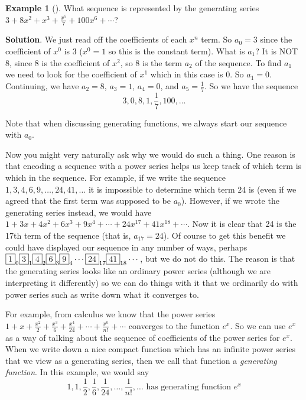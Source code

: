 \documentclass[10pt,]{book}
\theoremstyle{plain}
\theoremstyle{definition}
\theoremstyle{definition}
\newtheorem{example}[theorem]{Example}
\theoremstyle{definition}
\theoremstyle{definition}
\numberwithin{equation}{chapter}
\begin{document}
\begin{example}[]\label{example-22}
\hypertarget{p-955}{}%
What sequence is represented by the generating series \(3 + 8x^2 + x^3 + \frac{x^5}{7} + 100x^6 + \cdots\)?%
\par\smallskip%
\noindent\textbf{Solution}.\hypertarget{solution-94}{}\quad%
\hypertarget{p-956}{}%
We just read off the coefficients of each \(x^n\) term. So \(a_0 = 3\) since the coefficient of \(x^0\) is 3 (\(x^0 = 1\) so this is the constant term). What is \(a_1\)? It is NOT 8, since 8 is the coefficient of \(x^2\), so 8 is the term \(a_2\) of the sequence. To find \(a_1\) we need to look for the coefficient of \(x^1\) which in this case is 0. So \(a_1 = 0\). Continuing, we have \(a_2 = 8\), \(a_3 = 1\), \(a_4 = 0\), and \(a_5 = \frac{1}{7}\). So we have the sequence%
\begin{equation*}
3, 0, 8, 1, \frac{1}{7}, 100, \ldots
\end{equation*}
%
\par
\hypertarget{p-957}{}%
Note that when discussing generating functions, we always start our sequence with \(a_0\).%
\end{example}
\hypertarget{p-958}{}%
Now you might very naturally ask why we would do such a thing. One reason is that encoding a sequence with a power series helps us keep track of which term is which in the sequence. For example, if we write the sequence \(1, 3, 4, 6, 9, \ldots, 24, 41,\ldots\) it is impossible to determine which term \(24\) is (even if we agreed that the first term was supposed to be \(a_0\)). However, if we wrote the generating series instead, we would have \(1 + 3x + 4x^2 + 6x^3 + 9x^4 + \cdots + 24 x^{17} + 41 x^{18} + \cdots\). Now it is clear that 24 is the 17th term of the sequence (that is, \(a_{17} = 24\)). Of course to get this benefit we could have displayed our sequence in any number of ways, perhaps \(\fbox{1}_0 \fbox{3}_1 \fbox{4}_2 \fbox{6}_3 \fbox{9}_4 \cdots \fbox{24}_{17}\fbox{41}_{18}\cdots\), but we do not do this. The reason is that the generating series looks like an ordinary power series (although we are interpreting it differently) so we can do things with it that we ordinarily do with power series such as write down what it converges to.%
\par
\hypertarget{p-959}{}%
For example, from calculus we know that the power series \(1 + x + \frac{x^2}{2} + \frac{x^3}{6} + \frac{x^4}{24} + \cdots + \frac{x^n}{n!} + \cdots\) converges to the function \(e^x\). So we can use \(e^x\) as a way of talking about the sequence of coefficients of the power series for \(e^x\). When we write down a nice compact function which has an infinite power series that we view as a generating series, then we call that function a \emph{generating function}. In this example, we would say%
\begin{equation*}
1, 1, \frac{1}{2}, \frac{1}{6}, \frac{1}{24}, \ldots, \frac{1}{n!}, \ldots \mbox{ has generating function }  e^x
\end{equation*}
%
\typeout{************************************************}
\typeout{************************************************}
\end{document}

